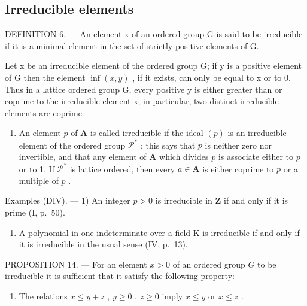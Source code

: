 \subsection{Irreducible elements}

DEFINITION 6. --- An element x of an ordered group G is said to be irreducible if it is a minimal element in the set of strictly positive elements of G.

Let x be an irreducible element of the ordered group G; if y is a positive element of G then the element \(\inf(x, y)\) , if it exists, can only be equal to x or to 0. Thus in a lattice ordered group G, every positive y is either greater than or coprime to the irreducible element x; in particular, two distinct irreducible elements are coprime.

\begin{enumerate}
\def\labelenumi{(\Roman{enumi})}
\setcounter{enumi}{503}
\tightlist
\item
  An element \(p\) of \(\mathbf{A}\) is called irreducible if the ideal \((p)\) is an irreducible element of the ordered group \(\mathcal{P}^*\) ; this says that \(p\) is neither zero nor invertible, and that any element of \(\mathbf{A}\) which divides \(p\) is associate either to \(p\) or to 1. If \(\mathcal{P}^*\) is lattice ordered, then every \(a \in \mathbf{A}\) is either coprime to \(p\) or a multiple of \(p\) .
\end{enumerate}

Examples (DIV). --- 1) An integer \(p > 0\) is irreducible in \(\mathbf{Z}\) if and only if it is prime (I, p.~50).

\begin{enumerate}
\def\labelenumi{\arabic{enumi})}
\setcounter{enumi}{1}
\tightlist
\item
  A polynomial in one indeterminate over a field K is irreducible if and only if it is irreducible in the usual sense (IV, p.~13).
\end{enumerate}

PROPOSITION 14. --- For an element \(x > 0\) of an ordered group \(G\) to be irreducible it is sufficient that it satisfy the following property:

\begin{enumerate}
\def\labelenumi{(\Alph{enumi})}
\setcounter{enumi}{15}
\tightlist
\item
  The relations \(x \leqslant y + z\) , \(y \geqslant 0\) , \(z \geqslant 0\) imply \(x \leqslant y\) or \(x \leqslant z\) .
\end{enumerate}

